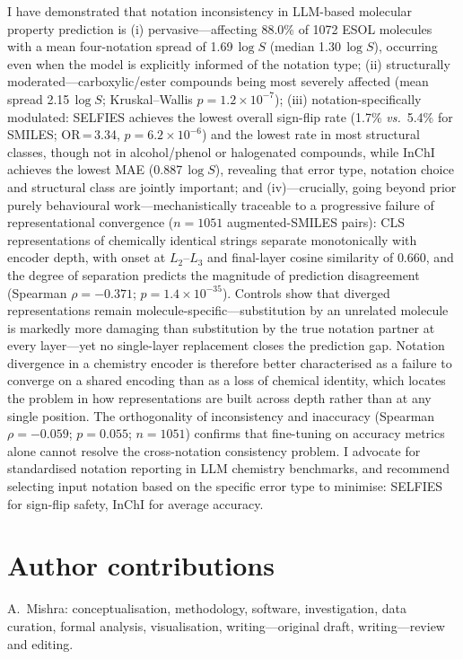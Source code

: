 \documentclass[twoside,twocolumn,9pt]{article}
\newcommand{\logS}{\ensuremath{\log S}}
\begin{document}
I have demonstrated that notation inconsistency in LLM-based molecular property prediction is (i) pervasive---affecting 88.0\% of 1072 ESOL molecules with a mean four-notation spread of 1.69\,$\logS$ (median 1.30\,$\logS$), occurring even when the model is explicitly informed of the notation type; (ii) structurally moderated---carboxylic/ester compounds being most severely affected (mean spread 2.15\,$\logS$; Kruskal--Wallis $p=1.2\!\times\!10^{-7}$); (iii) notation-specifically modulated: SELFIES achieves the lowest overall sign-flip rate (1.7\% \textit{vs.}\ 5.4\% for SMILES; OR\,=\,3.34, $p=6.2\!\times\!10^{-6}$) and the lowest rate in most structural classes, though not in alcohol/phenol or halogenated compounds, while InChI achieves the lowest MAE (0.887\,$\logS$), revealing that error type, notation choice and structural class are jointly important; and (iv)---crucially, going beyond prior purely behavioural work\cite{yan2025,ganeeva2025}---mechanistically traceable to a progressive failure of representational convergence ($n=1051$ augmented-SMILES pairs): CLS representations of chemically identical strings separate monotonically with encoder depth, with onset at $L_2$--$L_3$ and final-layer cosine similarity of 0.660, and the degree of separation predicts the magnitude of prediction disagreement (Spearman $\rho=-0.371$; $p=1.4\!\times\!10^{-35}$). Controls show that diverged representations remain molecule-specific---substitution by an unrelated molecule is markedly more damaging than substitution by the true notation partner at every layer---yet no single-layer replacement closes the prediction gap. Notation divergence in a chemistry encoder is therefore better characterised as a failure to converge on a shared encoding than as a loss of chemical identity, which locates the problem in how representations are built across depth rather than at any single position. The orthogonality of inconsistency and inaccuracy (Spearman $\rho=-0.059$; $p=0.055$; $n=1051$) confirms that fine-tuning on accuracy metrics alone cannot resolve the cross-notation consistency problem. I advocate for standardised notation reporting in LLM chemistry benchmarks, and recommend selecting input notation based on the specific error type to minimise: SELFIES for sign-flip safety, InChI for average accuracy.

\section*{Author contributions}

A.~Mishra: conceptualisation, methodology, software, investigation, data curation, formal analysis, visualisation, writing---original draft, writing---review and editing.
\end{document}
